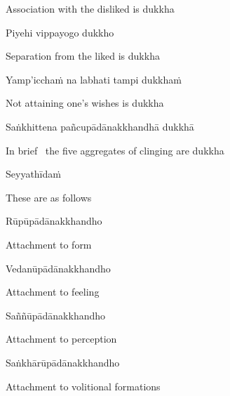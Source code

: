 \begin{english}
  Association with the disliked is dukkha
\end{english}

Piyehi vippayogo dukkho

\begin{english}
  Separation from the liked is dukkha
\end{english}

Yamp'icchaṁ na labhati tampi dukkhaṁ

\begin{english}
  Not attaining one's wishes is dukkha
\end{english}

Saṅkhittena pañcupādānakkhandhā dukkhā

\begin{english}
    In brief \breathmark\ the five aggregates of clinging are dukkha\makeatletter\hyperlink{endnote15-appendix}\makeatother
\end{english}

Seyyathīdaṁ

\begin{english}
  These are as follows
\end{english}

Rūpūpādānakkhandho

\begin{english}
  Attachment to form
\end{english}

Vedanūpādānakkhandho

\begin{english}
  Attachment to feeling
\end{english}

Saññūpādānakkhandho

\begin{english}
  Attachment to perception
\end{english}

Saṅkhārūpādānakkhandho

\begin{english}
    Attachment to volitional formations\makeatletter\hyperlink{endnote16-appendix}\makeatother
\end{english}

